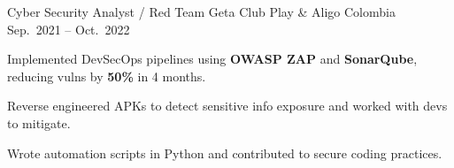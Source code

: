 \begin{cventries}
  \cventry
  {Cyber Security Analyst / Red Team}
  {Geta Club Play \& Aligo}
  {Colombia}
  {Sep.\ 2021 -- Oct.\ 2022}
  {
    \begin{cvitems}
      \item {Implemented DevSecOps pipelines using \textbf{OWASP ZAP} and \textbf{SonarQube}, reducing vulns by \textbf{50\%} in 4 months.}
      \item {Reverse engineered APKs to detect sensitive info exposure and worked with devs to mitigate.}
      \item {Wrote automation scripts in Python and contributed to secure coding practices.}
    \end{cvitems}
  }

\end{cventries}
